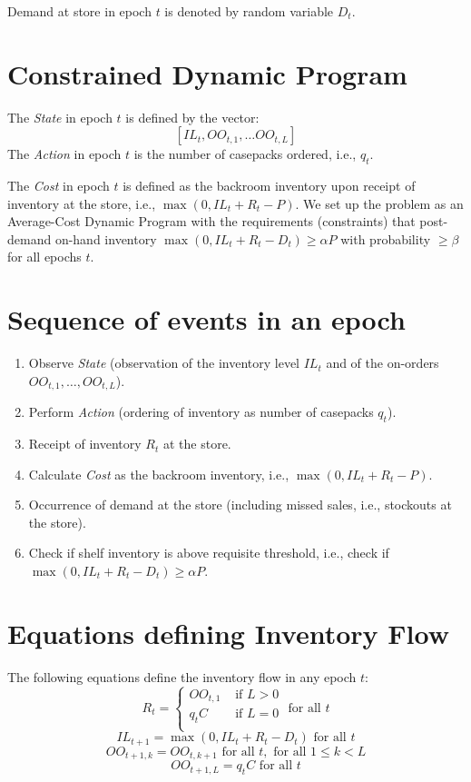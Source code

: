 \documentclass[12pt]{amsart}
\begin{document}
Demand at store in epoch $t$ is denoted by random variable $D_t$.

\section{Constrained Dynamic Program}
The {\em State} in epoch $t$ is defined by the vector:
 $$[IL_t, OO_{t,1}, \ldots OO_{t,L}]$$
 The {\em Action} in epoch $t$ is the number of casepacks ordered, i.e., $q_t$.
 
The {\em Cost} in epoch $t$ is defined as the backroom inventory upon receipt of inventory at the store, i.e., $\max(0, IL_t + R_t - P)$. We set up the problem as an Average-Cost Dynamic Program with the requirements (constraints) that post-demand on-hand inventory $\max(0, IL_t + R_t - D_t) \geq \alpha P$ with probability $\geq \beta$ for all epochs $t$.


\section{Sequence of events in an epoch}

\begin{enumerate}
\item Observe {\em State} (observation of the inventory level $IL_t$  and of the on-orders $OO_{t,1}, \ldots, OO_{t,L}$).
\item Perform {\em Action} (ordering of inventory as number of casepacks $q_t$).
\item Receipt of inventory $R_t$ at the store.
\item Calculate {\em Cost} as the backroom inventory, i.e., $\max(0, IL_t + R_t - P)$.
\item Occurrence of demand at the store (including missed sales, i.e., stockouts at the store).
\item Check if shelf inventory is above requisite threshold, i.e., check if $\max(0, IL_t + R_t - D_t) \geq \alpha P$.
\end{enumerate}

\section{Equations defining Inventory Flow}
The following equations define the inventory flow in any epoch $t$:
$$R_t =
\begin{cases}
OO_{t,1} & \text{ if } L > 0\\
q_t C & \text{ if } L = 0\\
\end{cases}
\mbox{ for all } t$$
$$IL_{t+1} = \max(0, IL_{t} + R_t - D_t) \mbox{ for all } t$$
$$OO_{t+1,k} = OO_{t,k+1} \mbox{ for all } t, \mbox{ for all } 1 \leq k < L$$
$$OO_{t+1,L} = q_t C  \mbox{ for all } t$$
\end{document}

